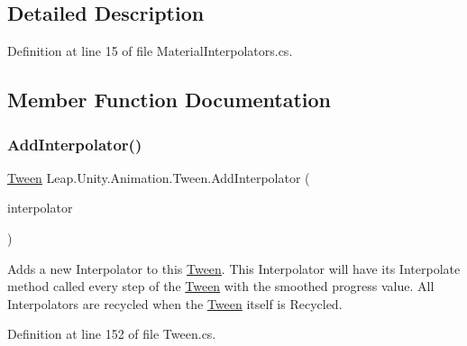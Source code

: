 \subsection{Detailed Description}


Definition at line 15 of file Material\+Interpolators.\+cs.



\subsection{Member Function Documentation}
\mbox{\label{struct_leap_1_1_unity_1_1_animation_1_1_tween_a4003f15c23a01d48cc1c2b5ecf48373c}} 
\subsubsection{\texorpdfstring{AddInterpolator()}{AddInterpolator()}}
{\footnotesize\ttfamily \mbox{\hyperlink{struct_leap_1_1_unity_1_1_animation_1_1_tween}{Tween}} Leap.\+Unity.\+Animation.\+Tween.\+Add\+Interpolator (\begin{DoxyParamCaption}\item[{\mbox{\hyperlink{interface_leap_1_1_unity_1_1_animation_1_1_i_interpolator}{I\+Interpolator}}}]{interpolator }\end{DoxyParamCaption})}



Adds a new Interpolator to this \mbox{\hyperlink{struct_leap_1_1_unity_1_1_animation_1_1_tween}{Tween}}. This Interpolator will have it\textquotesingle{}s Interpolate method called every step of the \mbox{\hyperlink{struct_leap_1_1_unity_1_1_animation_1_1_tween}{Tween}} with the smoothed progress value. All Interpolators are recycled when the \mbox{\hyperlink{struct_leap_1_1_unity_1_1_animation_1_1_tween}{Tween}} itself is Recycled. 



Definition at line 152 of file Tween.\+cs.

\mbox{\label{struct_leap_1_1_unity_1_1_animation_1_1_tween_a77dd8bb5e57e2fffe9351ad806eaf53f}} 
